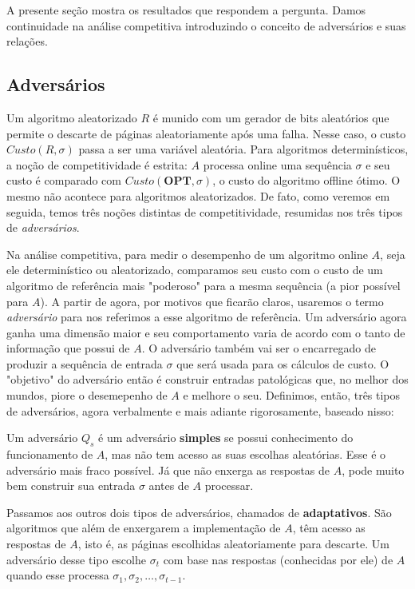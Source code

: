 A presente seção mostra os resultados que respondem a pergunta. Damos continuidade na análise competitiva introduzindo o conceito de adversários e suas relações.

\subsection{Adversários}

Um algoritmo aleatorizado \(R\) é munido com um gerador de bits aleatórios que permite o descarte de páginas aleatoriamente após uma falha. Nesse caso, o custo \(Custo(R,\sigma)\) passa a ser uma variável aleatória. Para algoritmos determinísticos, a noção de competitividade é estrita: \(A\) processa online uma sequência \(\sigma\) e seu custo é comparado com \(Custo(\textbf{OPT}, \sigma)\), o custo do algoritmo offline ótimo. O mesmo não acontece para algoritmos aleatorizados. De fato, como veremos em seguida, temos três noções distintas de competitividade, resumidas nos três tipos de \textit{adversários}. 

Na análise competitiva, para medir o desempenho de um algoritmo online \(A\), seja ele determinístico ou aleatorizado, comparamos seu custo com o custo de um algoritmo de referência mais "poderoso" para a mesma sequência (a pior possível para \(A\)). 
A partir de agora, por motivos que ficarão claros, usaremos o termo \textit{adversário} para nos referimos a esse algoritmo de referência. Um adversário agora ganha uma dimensão maior e seu comportamento varia de acordo com o tanto de informação que possui de \(A\). O adversário também vai ser o encarregado de produzir a sequência de entrada \(\sigma\) que será usada para os cálculos de custo. O "objetivo" do adversário então é construir entradas patológicas que, no melhor dos mundos, piore o desemepenho de \(A\) e melhore o seu. Definimos, então, três tipos de adversários, agora verbalmente e mais adiante rigorosamente, baseado nisso:

\begin{definition}
  Um adversário \(Q_s\) é um adversário \textbf{simples} se possui conhecimento do funcionamento de \(A\), mas não tem acesso as suas escolhas aleatórias. Esse é o adversário mais fraco possível. Já que não enxerga as respostas de \(A\), pode muito bem construir sua entrada \(\sigma\) antes de \(A\) processar. 
\end{definition}

Passamos aos outros dois tipos de adversários, chamados de \textbf{adaptativos}. São algoritmos que além de enxergarem a implementação de \(A\), têm acesso as respostas de \(A\), isto é, as páginas escolhidas aleatoriamente para descarte. Um adversário desse tipo escolhe \(\sigma_t\) com base nas respostas (conhecidas por ele) de \(A\) quando esse processa \(\sigma_1, \sigma_2, \dots, \sigma_{t-1}\).

